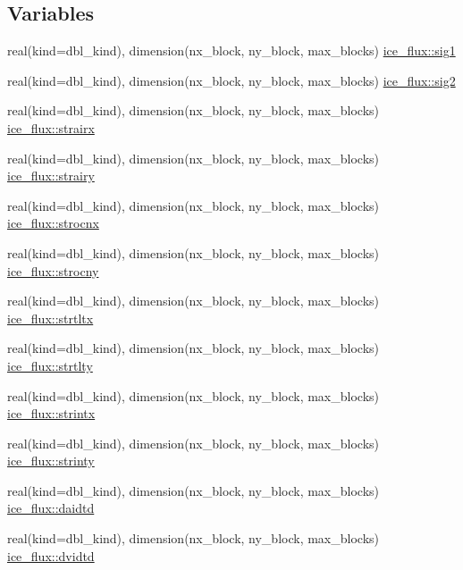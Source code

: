 \subsection*{Variables}
\begin{DoxyCompactItemize}
\item 
real(kind=dbl\_\-kind), dimension(nx\_\-block, ny\_\-block, max\_\-blocks) \hyperlink{namespaceice__flux_a4e0e291e34267f30266f8a41db36affb}{ice\_\-flux::sig1}
\item 
real(kind=dbl\_\-kind), dimension(nx\_\-block, ny\_\-block, max\_\-blocks) \hyperlink{namespaceice__flux_a7bf5a07a0946af77cd35135d6ce11771}{ice\_\-flux::sig2}
\item 
real(kind=dbl\_\-kind), dimension(nx\_\-block, ny\_\-block, max\_\-blocks) \hyperlink{namespaceice__flux_aee8a0e6c9637760d2b7153f40ffe0dc1}{ice\_\-flux::strairx}
\item 
real(kind=dbl\_\-kind), dimension(nx\_\-block, ny\_\-block, max\_\-blocks) \hyperlink{namespaceice__flux_af29d53fccf8950eaca0c31ea018640aa}{ice\_\-flux::strairy}
\item 
real(kind=dbl\_\-kind), dimension(nx\_\-block, ny\_\-block, max\_\-blocks) \hyperlink{namespaceice__flux_a3302aaf2e5a99949808d98b685228ecf}{ice\_\-flux::strocnx}
\item 
real(kind=dbl\_\-kind), dimension(nx\_\-block, ny\_\-block, max\_\-blocks) \hyperlink{namespaceice__flux_a0e146ebf56010398ef99ba1539dbc1ce}{ice\_\-flux::strocny}
\item 
real(kind=dbl\_\-kind), dimension(nx\_\-block, ny\_\-block, max\_\-blocks) \hyperlink{namespaceice__flux_a1380a09740e78ddbcc3abe4edc2b3e2f}{ice\_\-flux::strtltx}
\item 
real(kind=dbl\_\-kind), dimension(nx\_\-block, ny\_\-block, max\_\-blocks) \hyperlink{namespaceice__flux_ac9c1e92371b4e39d2aa9f38548b011ff}{ice\_\-flux::strtlty}
\item 
real(kind=dbl\_\-kind), dimension(nx\_\-block, ny\_\-block, max\_\-blocks) \hyperlink{namespaceice__flux_aff350f7a31d4c9cc9429ef1a14d1c91f}{ice\_\-flux::strintx}
\item 
real(kind=dbl\_\-kind), dimension(nx\_\-block, ny\_\-block, max\_\-blocks) \hyperlink{namespaceice__flux_a8bfac55007c715a028b0ac9b8e9daed5}{ice\_\-flux::strinty}
\item 
real(kind=dbl\_\-kind), dimension(nx\_\-block, ny\_\-block, max\_\-blocks) \hyperlink{namespaceice__flux_a24c9cd15dee4efbf6d35e4bafb03a6e0}{ice\_\-flux::daidtd}
\item 
real(kind=dbl\_\-kind), dimension(nx\_\-block, ny\_\-block, max\_\-blocks) \hyperlink{namespaceice__flux_ab2731d6607c7b88522d1a843d4a38a50}{ice\_\-flux::dvidtd}

\end{DoxyCompactItemize}
